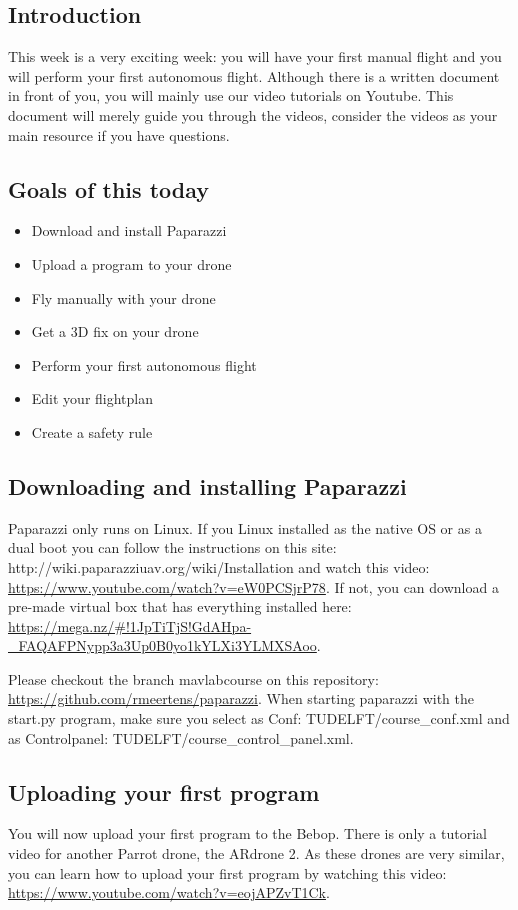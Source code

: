 \documentclass{article}
\begin{document}

\subsection*{Introduction}
This week is a very exciting week: you will have your first manual flight and you will perform your first autonomous flight. Although there is a written document in front of you, you will mainly use our video tutorials on Youtube. This document will merely guide you through the videos, consider the videos as your main resource if you have questions. 

\subsection*{Goals of this today}
\begin{itemize}
\item Download and install Paparazzi
\item Upload a program to your drone
\item Fly manually with your drone
\item Get a 3D fix on your drone
\item Perform your first autonomous flight
\item Edit your flightplan
\item Create a safety rule
\end{itemize}

\subsection*{Downloading and installing Paparazzi}
Paparazzi only runs on Linux. If you Linux installed as the native OS or as a dual boot you can follow the instructions on this site: http://wiki.paparazziuav.org/wiki/Installation and watch this video: \url{https://www.youtube.com/watch?v=eW0PCSjrP78}.
If not, you can download a pre-made virtual box that has everything installed here: \url{https://mega.nz/#!1JpTiTjS!GdAHpa-_FAQAFPNypp3a3Up0B0yo1kYLXi3YLMXSAoo}.

Please checkout the branch mavlabcourse on this repository: \url{https://github.com/rmeertens/paparazzi}.
When starting paparazzi with the start.py program, make sure you select as Conf: TUDELFT/course\_conf.xml and as Controlpanel: TUDELFT/course\_control\_panel.xml. 
\subsection*{Uploading your first program}
You will now upload your first program to the Bebop. There is only a tutorial video for another Parrot drone, the ARdrone 2. As these drones are very similar, you can learn how to upload your first program by watching this video: \url{https://www.youtube.com/watch?v=eojAPZvT1Ck}.
\end{document}

